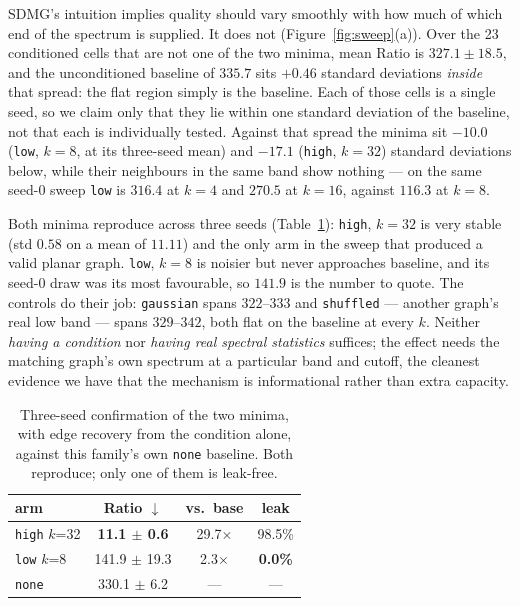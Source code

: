 \documentclass[11pt]{article}
\begin{document}
SDMG's intuition implies quality should vary smoothly with how much of which end of the spectrum
is supplied. It does not (Figure~\ref{fig:sweep}(a)). Over the 23 conditioned cells that are not one of the two minima, mean Ratio is $327.1 \pm 18.5$,
and the unconditioned baseline of $335.7$ sits $+0.46$ standard deviations \emph{inside} that
spread: the flat region simply is the baseline. Each of those cells is a single seed, so we claim
only that they lie within one standard deviation of the baseline, not that each is individually
tested. Against that spread the minima sit $-10.0$ (\texttt{low}, $k{=}8$, at its three-seed mean)
and $-17.1$ (\texttt{high}, $k{=}32$) standard deviations below, while their neighbours in the
same band show nothing --- on the same seed-0 sweep \texttt{low} is $316.4$ at $k{=}4$ and
$270.5$ at $k{=}16$, against $116.3$ at $k{=}8$.

Both minima reproduce across three seeds (Table~\ref{tab:spikes}): \texttt{high}, $k{=}32$ is very
stable (std $0.58$ on a mean of $11.11$) and the only arm in the sweep that produced a valid
planar graph. \texttt{low}, $k{=}8$ is noisier but never approaches baseline, and its seed-0
draw was its most favourable, so $141.9$ is the number to quote. The controls do
their job: \texttt{gaussian} spans $322$--$333$ and \texttt{shuffled} --- another graph's real low
band --- spans $329$--$342$, both flat on the baseline at every $k$. Neither \emph{having a
condition} nor \emph{having real spectral statistics} suffices; the effect needs the matching
graph's own spectrum at a particular band and cutoff, the cleanest evidence we have that
the mechanism is informational rather than extra capacity.

\begin{table}[t]
\centering\footnotesize
\setlength{\tabcolsep}{5pt}
\begin{tabular}{lccc}
\toprule
arm & Ratio $\downarrow$ & vs.\ base & leak \\
\midrule
\texttt{high} $k${=}32 & \textbf{11.1 $\pm$ 0.6} & 29.7$\times$ & 98.5\% \\
\texttt{low} $k${=}8   & 141.9 $\pm$ 19.3 & 2.3$\times$ & \textbf{0.0\%} \\
\texttt{none}          & 330.1 $\pm$ 6.2 & --- & --- \\
\bottomrule
\end{tabular}
\caption{Three-seed confirmation of the two minima, with edge recovery from the condition alone,
against this family's own \texttt{none} baseline. Both reproduce; only one of them is leak-free.}
\label{tab:spikes}
\end{table}
\end{document}
